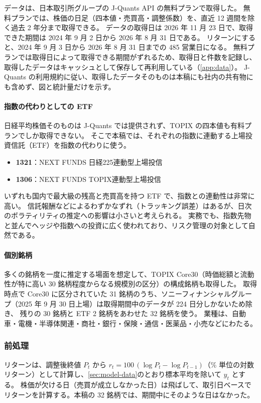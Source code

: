 データは、日本取引所グループの J-Quants API \parencite{jquants}の無料プランで取得した。
無料プランでは、株価の日足（四本値・売買高・調整係数）を、直近 12 週間を除く過去 2 年分まで取得できる。
データの取得日は 2026 年 11 月 23 日で、取得できた期間は 2024 年 9 月 2 日から 2026 年 8 月 31 日である。
リターンにすると、2024 年 9 月 3 日から 2026 年 8 月 31 日までの 485 営業日になる。
無料プランでは取得日によって取得できる期間がずれるため、取得日と件数を記録し、取得したデータはキャッシュとして保存して再利用している（\cref{app:data}）。
J-Quants の利用規約に従い、取得したデータそのものは本稿にも社内の共有物にも含めず、図と統計量だけを示す。

\paragraph{指数の代わりとしての ETF}
日経平均株価そのものは J-Quants では提供されず、TOPIX の四本値も有料プランでしか取得できない。
そこで本稿では、それぞれの指数に連動する上場投資信託（ETF）を指数の代わりに使う。
\begin{itemize}
  \item \textbf{1321}：NEXT FUNDS 日経225連動型上場投信
  \item \textbf{1306}：NEXT FUNDS TOPIX連動型上場投信
\end{itemize}
いずれも国内で最大級の残高と売買高を持つ ETF で、指数との連動性は非常に高い。
信託報酬などによるわずかなずれ（トラッキング誤差）はあるが、日次のボラティリティの推定への影響は小さいと考えられる。
実務でも、指数先物と並んでヘッジや指数への投資に広く使われており、リスク管理の対象として自然である。

\paragraph{個別銘柄}
多くの銘柄を一度に推定する場面を想定して、TOPIX Core30（時価総額と流動性が特に高い 30 銘柄程度からなる規模別の区分）の構成銘柄も取得した。
取得時点で Core30 に区分されていた 31 銘柄のうち、ソニーフィナンシャルグループ（2025 年 9 月 30 日上場）は取得期間中のデータが 224 日分しかないため除き、
残りの 30 銘柄と ETF 2 銘柄をあわせた 32 銘柄を使う。
業種は、自動車・電機・半導体関連・商社・銀行・保険・通信・医薬品・小売などにわたる。

\subsubsection{前処理}

リターンは、調整後終値 $P_t$ から $r_t = 100\,(\log P_t - \log P_{t-1})$（\% 単位の対数リターン）として計算し、\cref{sec:model-data}のとおり標本平均を除いて $y_t$ とする。
株価が欠ける日（売買が成立しなかった日）は飛ばして、取引日ベースでリターンを計算する。本稿の 32 銘柄では、期間中にそのような日はなかった。

